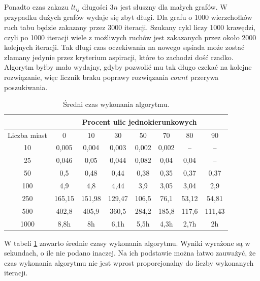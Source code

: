\documentclass[11pt,a4paper,twoside]{article}
\begin{document}

Ponadto czas zakazu $lt_{ij}$ długości $3n$ jest słuszny dla małych grafów. W przypadku dużych grafów wydaje się zbyt długi. Dla grafu o 1000 wierzchołków ruch tabu będzie zakazany przez 3000 iteracji. Szukany cykl liczy 1000 krawędzi, czyli po 1000 iteracji wiele z możliwych ruchów jest zakazanych przez około 2000 kolejnych iteracji. Tak długi czas oczekiwania na nowego sąsiada może zostać złamany jedynie przez kryterium aspiracji, które to zachodzi dość rzadko. Algorytm byłby mało wydajny, gdyby pozwolić mu tak długo czekać na kolejne rozwiązanie, więc licznik braku poprawy rozwiązania $count$ przerywa poszukiwania.

\bgroup
\def\arraystretch{1.2}
\begin{table}[ht]
\centering
\begin{tabular}{|c|c|c|c|c|c|c|c|}
\hline
 & \multicolumn{7}{c|}{Procent ulic jednokierunkowych}\\\hline
Liczba miast & 0 & 10 & 30 & 50 & 70& 80& 90\\  \hline
10& 0,005& 0,004& 0,003& 0,002& 0,002& --& --\\ \hline
25& 0,046& 0,05& 0,044& 0,082& 0,04& 0,04& --\\ \hline
50& 0,5& 0,48& 0,44& 0,38& 0,35& 0,37& 0,37\\ \hline
100& 4,9& 4,8& 4,44& 3,9& 3,05& 3,04& 2,9\\ \hline
250& 165,15& 151,98& 129,47& 106,5& 76,1& 53,12& 54,81 \\ \hline
500& 402,8& 405,9& 360,5& 284,2& 185,8& 117,6& 111,43\\ \hline
1000& 8,8h& 8h& 6,1h& 5,5h& 4,3h& 2,7h& 2h\\ \hline
\end{tabular}
\caption{Średni czas wykonania algorytmu.}
\label{czasWykonania}
\end{table}
\egroup

W tabeli \ref{czasWykonania} zawarto średnie czasy wykonania algorytmu. Wyniki wyrażone są w sekundach, o ile nie podano inaczej. Na ich podstawie można łatwo zauważyć, że czas wykonania algorytmu nie jest wprost proporcjonalny do liczby wykonanych iteracji. 
\end{document}
